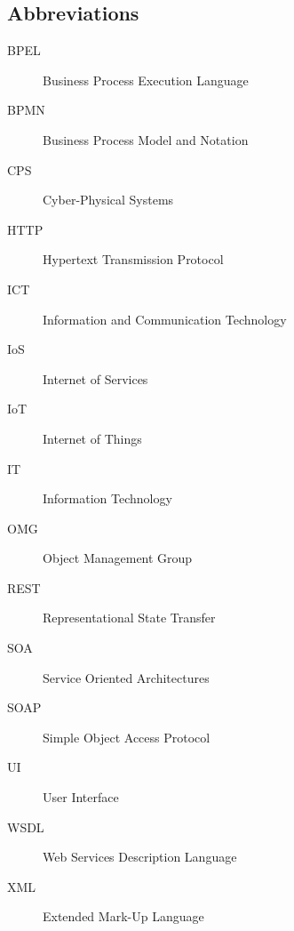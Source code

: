 \begin{appendix}
\chapter{Abbreviations}
\begin{description}
	\item[BPEL] Business Process Execution Language
	\item[BPMN] Business Process Model and Notation
	\item[CPS] Cyber-Physical Systems
	\item[HTTP] Hypertext Transmission Protocol
	\item[ICT] Information and Communication Technology
	\item[IoS] Internet of Services
	\item[IoT] Internet of Things
	\item[IT] Information Technology
	\item[OMG] Object Management Group
	\item[REST] Representational State Transfer
	\item[SOA] Service Oriented Architectures
	\item[SOAP] Simple Object Access Protocol
	\item[UI] User Interface
	\item[WSDL] Web Services Description Language
	\item[XML] Extended Mark-Up Language
\end{description}
\end{appendix}